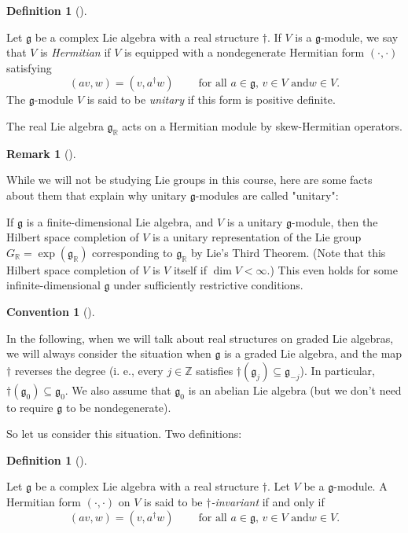 \documentclass
[numbers=enddot,12pt,final,onecolumn,german,notitlepage]{scrartcl}%
\theoremstyle{definition}
\newtheorem{defi}[theo]{Definition}
\newenvironment{definition}[1][]
{\begin{defi}[#1]\begin{leftbar}}
{\end{leftbar}\end{defi}}
\newtheorem{remk}[theo]{Remark}
\newenvironment{remark}[1][]
{\begin{remk}[#1]\begin{leftbar}}
{\end{leftbar}\end{remk}}
\newtheorem{conv}[theo]{Convention}
\newenvironment{Convention}[1][]
{\begin{conv}[#1]\begin{leftbar}}
{\end{leftbar}\end{conv}}
\begin{document}
\begin{definition}
Let $\mathfrak{g}$ be a complex Lie algebra with a real structure $\dag$. If
$V$ is a $\mathfrak{g}$-module, we say that $V$ is \textit{Hermitian} if $V$
is equipped with a nondegenerate Hermitian form $\left(  \cdot,\cdot\right)  $
satisfying%
\[
\left(  av,w\right)  =\left(  v,a^{\dag}w\right)
\ \ \ \ \ \ \ \ \ \ \text{for all }a\in\mathfrak{g}\text{, }v\in V\text{ and
}w\in V.
\]
The $\mathfrak{g}$-module $V$ is said to be \textit{unitary} if this form is
positive definite.
\end{definition}

The real Lie algebra $\mathfrak{g}_{\mathbb{R}}$ acts on a Hermitian module by
skew-Hermitian operators.

\begin{remark}
While we will not be studying Lie groups in this course, here are some facts
about them that explain why unitary $\mathfrak{g}$-modules are called "unitary":

If $\mathfrak{g}$ is a finite-dimensional Lie algebra, and $V$ is a unitary
$\mathfrak{g}$-module, then the Hilbert space completion of $V$ is a unitary
representation of the Lie group $G_{\mathbb{R}}=\exp\left(  \mathfrak{g}%
_{\mathbb{R}}\right)  $ corresponding to $\mathfrak{g}_{\mathbb{R}}$ by Lie's
Third Theorem. (Note that this Hilbert space completion of $V$ is $V$ itself
if $\dim V<\infty$.) This even holds for some infinite-dimensional
$\mathfrak{g}$ under sufficiently restrictive conditions.
\end{remark}

\begin{Convention}
In the following, when we will talk about real structures on graded Lie
algebras, we will always consider the situation when $\mathfrak{g}$ is a
graded Lie algebra, and the map $\dag$ reverses the degree (i. e., every
$j\in\mathbb{Z}$ satisfies $\dag\left(  \mathfrak{g}_{j}\right)
\subseteq\mathfrak{g}_{-j}$). In particular, $\dag\left(  \mathfrak{g}%
_{0}\right)  \subseteq\mathfrak{g}_{0}$. We also assume that $\mathfrak{g}%
_{0}$ is an abelian Lie algebra (but we don't need to require $\mathfrak{g}$
to be nondegenerate).
\end{Convention}

So let us consider this situation. Two definitions:

\begin{definition}
Let $\mathfrak{g}$ be a complex Lie algebra with a real structure $\dag$. Let
$V$ be a $\mathfrak{g}$-module. A Hermitian form $\left(  \cdot,\cdot\right)
$ on $V$ is said to be $\dag$\textit{-invariant} if and only if%
\[
\left(  av,w\right)  =\left(  v,a^{\dag}w\right)
\ \ \ \ \ \ \ \ \ \ \text{for all }a\in\mathfrak{g}\text{, }v\in V\text{ and
}w\in V.
\]

\end{definition}
\end{document}
